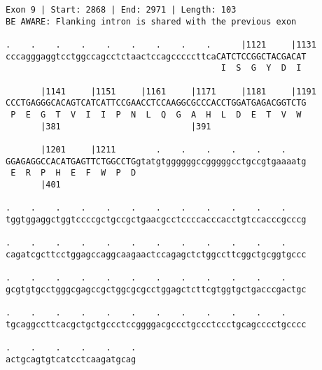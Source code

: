 \documentclass{article}
\begin{document}
\newpage
\begin{Verbatim}
Exon 9 | Start: 2868 | End: 2971 | Length: 103
BE AWARE: Flanking intron is shared with the previous exon
 
.    .    .    .    .    .    .    .    .      |1121     |1131
cccagggaggtcctggccagcctctaactccagcccccttcaCATCTCCGGCTACGACAT
                                           I  S  G  Y  D  I 
  
       |1141     |1151     |1161     |1171     |1181     |1191
CCCTGAGGGCACAGTCATCATTCCGAACCTCCAAGGCGCCCACCTGGATGAGACGGTCTG
 P  E  G  T  V  I  I  P  N  L  Q  G  A  H  L  D  E  T  V  W 
       |381                          |391                   
  
       |1201     |1211        .    .    .    .    .    .    
GGAGAGGCCACATGAGTTCTGGCCTGgtatgtggggggccgggggcctgccgtgaaaatg
 E  R  P  H  E  F  W  P  D                                  
       |401                                                 
  
.    .    .    .    .    .    .    .    .    .    .    .    
tggtggaggctggtccccgctgccgctgaacgcctccccacccacctgtccacccgcccg
  
.    .    .    .    .    .    .    .    .    .    .    .    
cagatcgcttcctggagccaggcaagaactccagagctctggccttcggctgcggtgccc
  
.    .    .    .    .    .    .    .    .    .    .    .    
gcgtgtgcctgggcgagccgctggcgcgcctggagctcttcgtggtgctgacccgactgc
  
.    .    .    .    .    .    .    .    .    .    .    .    
tgcaggccttcacgctgctgccctccggggacgccctgccctccctgcagcccctgcccc
  
.    .    .    .    .    .
actgcagtgtcatcctcaagatgcag
\end{Verbatim}
\newpage
\end{document}
